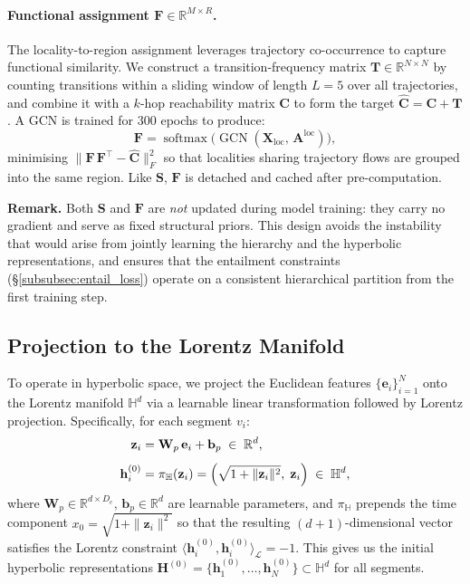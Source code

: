 \paragraph{Functional assignment $\mathbf{F} \in \mathbb{R}^{M \times R}$.}
The locality-to-region assignment leverages trajectory co-occurrence to capture functional similarity.
We construct a transition-frequency matrix $\mathbf{T} \in \mathbb{R}^{N \times N}$ by counting transitions within a sliding window of length $L{=}5$ over all trajectories, and combine it with a $k$-hop reachability matrix $\mathbf{C}$ to form the target $\hat{\mathbf{C}} = \mathbf{C} + \mathbf{T}$.
A GCN is trained for 300 epochs to produce:
\begin{equation}\label{eq:fnc_assign}
  \mathbf{F} = \operatorname{softmax}\!\bigl(\operatorname{GCN}(\mathbf{X}_{\text{loc}},\, \mathbf{A}^{\text{loc}})\bigr),
\end{equation}
minimising $\|\mathbf{F}\,\mathbf{F}^\top - \hat{\mathbf{C}}\|_F^2$ so that localities sharing trajectory flows are grouped into the same region.
Like $\mathbf{S}$, $\mathbf{F}$ is detached and cached after pre-computation.

\medskip
\noindent
\textbf{Remark.}
Both $\mathbf{S}$ and $\mathbf{F}$ are \emph{not} updated during model training: they carry no gradient and serve as fixed structural priors.
This design avoids the instability that would arise from jointly learning the hierarchy and the hyperbolic representations,
and ensures that the entailment constraints (\S\ref{subsubsec:entail_loss}) operate on a consistent hierarchical partition from the first training step.

\subsection{Projection to the Lorentz Manifold}\label{subsec:hyp_proj}

To operate in hyperbolic space, we project the Euclidean features $\{\mathbf{e}_i\}_{i=1}^N$ onto the Lorentz manifold $\mathbb{H}^d$ via a learnable linear transformation followed by Lorentz projection.
Specifically, for each segment $v_i$:
\begin{align}
  \mathbf{z}_i &= \mathbf{W}_p\,\mathbf{e}_i + \mathbf{b}_p
    \;\in\; \mathbb{R}^{d}, \label{eq:linear_proj}\\[4pt]
  \mathbf{h}_i^{(0)} &= \pi_{\mathbb{H}}(\mathbf{z}_i)
    = \Bigl(\sqrt{1 + \|\mathbf{z}_i\|^2},\; \mathbf{z}_i\Bigr)
    \;\in\; \mathbb{H}^{d}, \label{eq:lorentz_proj}
\end{align}
where $\mathbf{W}_p \in \mathbb{R}^{d \times D_e}$, $\mathbf{b}_p \in \mathbb{R}^{d}$ are learnable parameters, and $\pi_{\mathbb{H}}$ prepends the time component $x_0 = \sqrt{1 + \|\mathbf{z}_i\|^2}$ so that the resulting $(d{+}1)$-dimensional vector satisfies the Lorentz constraint $\langle \mathbf{h}_i^{(0)}, \mathbf{h}_i^{(0)} \rangle_{\mathcal{L}} = -1$.
This gives us the initial hyperbolic representations $\mathbf{H}^{(0)} = \{\mathbf{h}_1^{(0)}, \dots, \mathbf{h}_N^{(0)}\} \subset \mathbb{H}^d$ for all segments.

